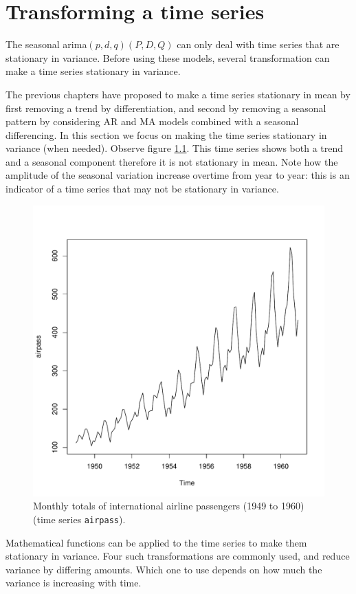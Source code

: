 \documentclass[a4paper,11pt,oneside,onecolumn]{book}
\begin{document}
  
\chapter{Transforming a time series} 
\label{chp:PreparationTS}


The seasonal arima$(p,d,q)(P,D,Q)$ can only deal with time series that are stationary in variance.
Before using these models, several transformation can make a time series stationary in variance. 

The previous chapters have proposed to make a time series stationary in mean by first removing a trend by differentiation, and second by removing a seasonal pattern by
considering AR and MA models combined with a seasonal differencing.
In this section we focus on making the time series stationary in variance (when needed). 
Observe figure \ref{fig:airpass}. This time series shows both a trend and a seasonal component
therefore it is not stationary in mean.
Note how the amplitude of the seasonal variation increase overtime from year to year: this is an indicator  of a time series that may  not be stationary in variance.



\begin{figure}[!h]
\begin{center}
\includegraphics[width=.5\linewidth]{airpass}
\caption{Monthly totals of international airline passengers (1949 to 1960) (time series \texttt{airpass}).}
\label{fig:airpass}
\end{center}
\end{figure}

Mathematical  functions can be applied to the time series to make them stationary in variance.
Four such transformations are commonly used, and reduce variance
by differing amounts. Which one to use depends on how much the
variance is increasing with time.
\end{document}
